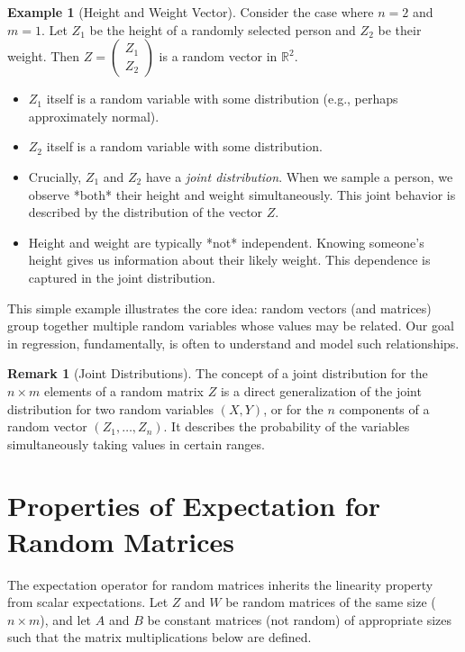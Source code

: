 \documentclass[11pt]{article}
\theoremstyle{definition}
\newtheorem{example}[theorem]{Example}
\newtheorem{remark}[theorem]{Remark}
\begin{document}
\begin{example}[Height and Weight Vector]
Consider the case where $n=2$ and $m=1$. Let $Z_1$ be the height of a randomly selected person and $Z_2$ be their weight. Then $Z = \begin{pmatrix} Z_1 \\ Z_2 \end{pmatrix}$ is a random vector in $\mathbb{R}^2$.
\begin{itemize}
    \item $Z_1$ itself is a random variable with some distribution (e.g., perhaps approximately normal).
    \item $Z_2$ itself is a random variable with some distribution.
    \item Crucially, $Z_1$ and $Z_2$ have a \textit{joint distribution}. When we sample a person, we observe *both* their height and weight simultaneously. This joint behavior is described by the distribution of the vector $Z$.
    \item Height and weight are typically *not* independent. Knowing someone's height gives us information about their likely weight. This dependence is captured in the joint distribution.
\end{itemize}
This simple example illustrates the core idea: random vectors (and matrices) group together multiple random variables whose values may be related. Our goal in regression, fundamentally, is often to understand and model such relationships.
\end{example}

\begin{remark}[Joint Distributions]
The concept of a joint distribution for the $n \times m$ elements of a random matrix $Z$ is a direct generalization of the joint distribution for two random variables $(X, Y)$, or for the $n$ components of a random vector $(Z_1, \dots, Z_n)$. It describes the probability of the variables simultaneously taking values in certain ranges.
\end{remark}

\section{Properties of Expectation for Random Matrices}

The expectation operator for random matrices inherits the linearity property from scalar expectations. Let $Z$ and $W$ be random matrices of the same size ($n \times m$), and let $A$ and $B$ be constant matrices (not random) of appropriate sizes such that the matrix multiplications below are defined.
\end{document}
